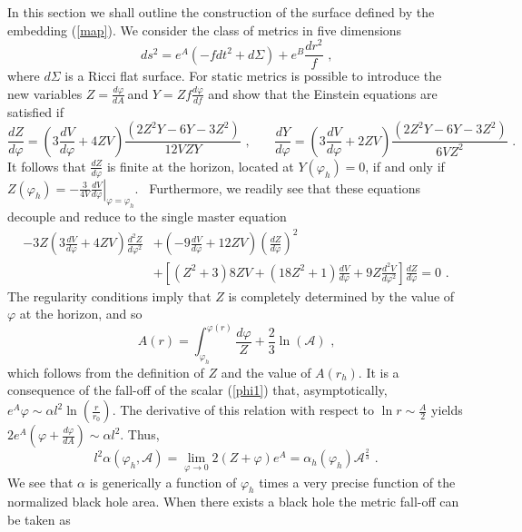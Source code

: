 \documentclass[11pt,epsf,letterpaper]{article}%
\begin{document}
In this section we shall outline the construction of the surface defined by
the embedding (\ref{map}). We consider the class of metrics in five
dimensions
\begin{equation}
ds^{2}=e^{A}(-fdt^{2}+d\Sigma)+e^{B}\frac{dr^{2}}{f}\text{ ,} \label{metclass}%
\end{equation}
where $d\Sigma$ is a Ricci flat surface. For static metrics is possible to
introduce the new variables $Z=\frac{d\varphi}{dA}~$and $Y=Zf\frac{d\varphi
}{df}$ and show that the Einstein equations are satisfied if
\begin{equation}
\frac{dZ}{d\varphi}=\left(  3\frac{dV}{d\varphi}+4ZV\right)  \frac{\left(
2Z^{2}Y-6Y-3Z^{2}\right)  }{12VZY}\text{ ,}\qquad\frac{dY}{d\varphi}=\left(
3\frac{dV}{d\varphi}+2ZV\right)  \frac{\left(  2Z^{2}Y-6Y-3Z^{2}\right)
}{6VZ^{2}}\text{ .}%
\end{equation}
It follows that $\frac{dZ}{d\varphi}$ is finite at the horizon, located at
$Y(\varphi_{h})=0$, if and only if $Z\left(  \varphi_{h}\right)  =-\left.
\frac{3}{4V}\frac{dV}{d\varphi}\right\vert _{\varphi=\varphi_{h}}$.
\ Furthermore, we readily see that these equations decouple and reduce to the
single master equation%
\begin{align}
-3Z\left(  3\frac{dV}{d\varphi} + 4ZV\right)  \frac{d^{2}Z}{d\varphi^{2}}  &
+\left(  -9\frac{dV}{d\varphi} +12ZV\right)  \left(  \frac{dZ}{d\varphi
}\right)  ^{2}\nonumber\\
&  +\left[  \left(  Z^{2}+3\right)  8ZV+\left(  18Z^{2}+1\right)  \frac
{dV}{d\varphi}+9Z\frac{d^{2}V}{d\varphi^{2}}\right]  \frac{dZ}{d\varphi
}=0\text{ .}%
\end{align}
The regularity conditions imply that $Z$ is completely determined by the value
of $\varphi$ at the horizon, and so
\begin{equation}
A\left(  r\right)  =\int_{\varphi_{h}}^{\varphi(r)}\frac{d\varphi}{Z}+\frac
{2}{3}\ln\left(  \mathcal{A}\right)  \text{ ,}%
\end{equation}
which follows from the definition of $Z$ and the value of $A(r_{h})$. It is a
consequence of the fall-off of the scalar (\ref{phi1}) that, asymptotically,
$e^{A}\varphi\sim\alpha l^{2}\ln(\frac{r}{r_{0}}).$ The derivative of this
relation with respect to $\ln r\sim\frac{A}{2}$ yields $2e^{A}\left(
\varphi+\frac{d\varphi}{dA}\right)  \sim\alpha l^{2}$. Thus,
\begin{equation}
l^{2}\alpha\left(  \varphi_{h},\mathcal{A}\right)  ={\lim_{\varphi
\rightarrow0}}2\left(  Z+\varphi\right)  e^{A}=\alpha_{h}\left(  \varphi
_{h}\right)  \mathcal{A}^{\frac{2}{3}}\text{ .} \label{map 1}%
\end{equation}
We see that $\alpha$ is generically a function of $\varphi_{h}$ times a very
precise function of the normalized black hole area. When there exists a black
hole the metric fall-off can be taken as%
\end{document}
